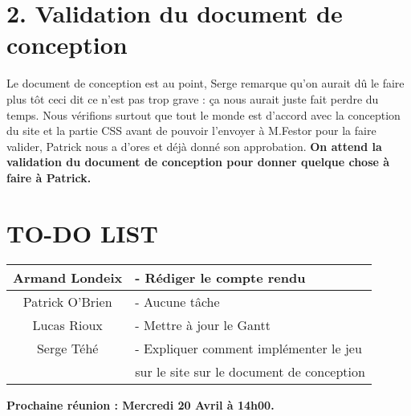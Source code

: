 \section*{2. Validation du document de conception}
\tabto{1cm}Le document de conception est au point, Serge remarque qu’on aurait dû le faire plus tôt ceci dit ce n’est pas trop grave : ça nous aurait juste fait perdre du temps.
Nous vérifions surtout que tout le monde est d’accord avec la conception du site et la partie CSS avant de pouvoir l’envoyer à M.Festor pour la faire valider, Patrick nous a d’ores et déjà donné son approbation. \textbf{On attend la validation du document de conception pour donner quelque chose à faire à Patrick.}

\section*{TO-DO LIST}

\begin{center}
\begin{tabular}{|c|l|}
    \hline
    Armand Londeix & - Rédiger le compte rendu \\
    \hline
    Patrick O'Brien & - Aucune tâche \\
    \hline
    Lucas Rioux & - Mettre à jour le Gantt \\
    \hline
    Serge Téhé & - Expliquer comment implémenter le jeu \\
    & sur le site sur le document de conception \\
    \hline
\end{tabular}
\end{center}

\tabto{0cm}\textbf{Prochaine réunion : Mercredi 20 Avril à 14h00.}